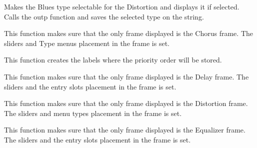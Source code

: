 \documentclass[letterpaper,10pt,english]{sphinxmanual}
\begin{document}

\begin{fulllineitems}
\label{Code:GUI.BLUES_val}
Makes the Blues type selectable for the Distortion and displays it if selected. Calls the outp function and saves the selected 
type on the string.

\end{fulllineitems}


\begin{fulllineitems}
\label{Code:GUI.Chorus}
This function makes sure that the only frame displayed is the Chorus frame. The sliders and Type menus placement 
in the frame is set.

\end{fulllineitems}


\begin{fulllineitems}
\label{Code:GUI.Create_labels}
This function creates the labels where the priority order will be stored.

\end{fulllineitems}


\begin{fulllineitems}
\label{Code:GUI.Delay}
This function makes sure that the only frame displayed is the Delay frame. The sliders and the entry slots placement in
the frame is set.

\end{fulllineitems}


\begin{fulllineitems}
\label{Code:GUI.Distortion}
This function makes sure that the only frame displayed is the Distortion frame. The sliders and menu types placement 
in the frame is set.

\end{fulllineitems}


\begin{fulllineitems}
\label{Code:GUI.EQ}
This function makes sure that the only frame displayed is the Equalizer frame. The sliders and the entry slots placement in
the frame is set.

\end{fulllineitems}
\end{document}
